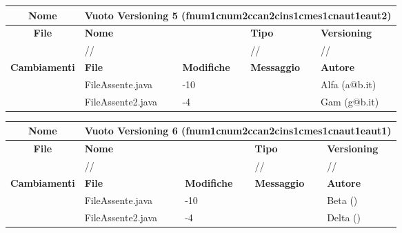 \begin{table}[ht]
\footnotesize
\begin{tabular}{|c|p{2.5cm}|p{2cm}|p{2.5cm}|p{2.5cm}|}
  \hline
  \textbf{Nome}	& \multicolumn{4}{l|}{Vuoto Versioning 5 (fnum1cnum2ccan2cins1cmes1cnaut1eaut2)} 							\\
  \hline
  \rowcolor{lightgray}\textbf{File} 		& \multicolumn{2}{l|}{\textbf{Nome}}		& \textbf{Tipo}		& \textbf{Versioning} 		\\
						\cline{2-5}
						& \multicolumn{2}{l|}{//}			& //			& //				\\
  \hline
  \rowcolor{lightgray}\textbf{Cambiamenti}	& \textbf{File}		&\textbf{Modifiche}	& \textbf{Messaggio}	& \textbf{Autore}		\\
						\cline{2-5}
						& FileAssente.java	& -10	  		& 			& Alfa (a@b.it)			\\
						\cline{2-5}
						& FileAssente2.java	& -4	  		& 			& Gam (g@b.it)			\\
  \hline
\end{tabular}
\end{table}

\begin{table}[ht]
\footnotesize
\begin{tabular}{|c|p{2.5cm}|p{2cm}|p{2.5cm}|p{2.5cm}|}
  \hline
  \textbf{Nome}	& \multicolumn{4}{l|}{Vuoto Versioning 6 (fnum1cnum2ccan2cins1cmes1cnaut1eaut1)} 							\\
  \hline
  \rowcolor{lightgray}\textbf{File} 		& \multicolumn{2}{l|}{\textbf{Nome}}		& \textbf{Tipo}		& \textbf{Versioning} 		\\
						\cline{2-5}
						& \multicolumn{2}{l|}{//}			& //			& //				\\
  \hline
  \rowcolor{lightgray}\textbf{Cambiamenti}	& \textbf{File}		&\textbf{Modifiche}	& \textbf{Messaggio}	& \textbf{Autore}		\\
						\cline{2-5}
						& FileAssente.java	& -10	  		& 			& Beta ()			\\
						\cline{2-5}
						& FileAssente2.java	& -4	  		& 			& Delta ()			\\
  \hline
\end{tabular}
\end{table}

